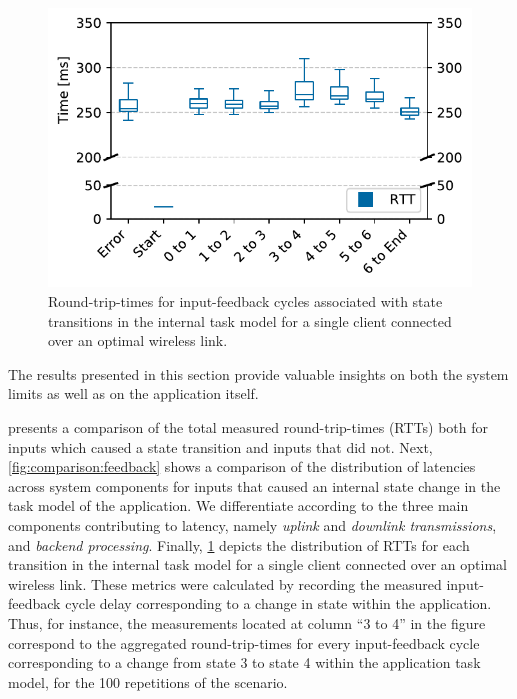 \begin{figure}%
    \centering%
    \includegraphics[width=.85\columnwidth]{publications/2019EdgeDroid/plots/comparison/nofonts/box_taskstep}%
    \caption{Round-trip-times for input-feedback cycles associated with state transitions in the internal task model for a single client connected over an optimal wireless link.}%
    \label{fig:comparison:tasksteps}
\end{figure}%

The results presented in this section provide valuable insights on both the system limits as well as on the application itself.

 presents a comparison of the total measured round-trip-times (RTTs) both for inputs which caused a state transition and inputs that did not.
Next, \cref{fig:comparison:feedback} shows a comparison of the distribution of latencies across system components for inputs that caused an internal state change in the task model of the application.
We differentiate according to the three main components contributing to latency, namely \emph{uplink} and \emph{downlink transmissions}, and \emph{backend processing}.
Finally, \cref{fig:comparison:tasksteps} depicts the distribution of RTTs for each transition in the internal task model for a single client connected over an optimal wireless link.
These metrics were calculated by recording the measured input-feedback cycle delay corresponding to a change in state within the application.
Thus, for instance, the measurements located at column ``3 to 4'' in the figure correspond to the aggregated round-trip-times for every input-feedback cycle corresponding to a change from state 3 to state 4 within the application task model, for the 100 repetitions of the scenario.

